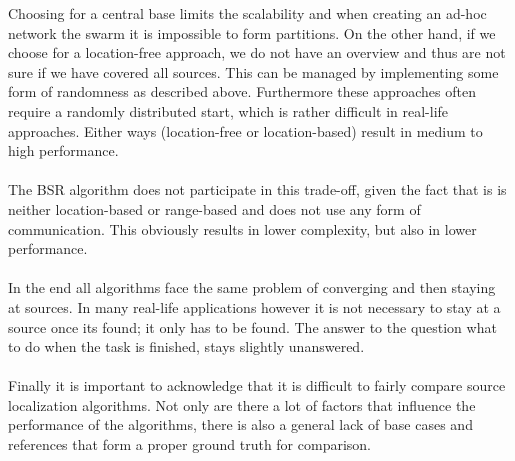 	Choosing for a central base limits the scalability and when creating an ad-hoc network the swarm it is impossible to form partitions. 
	On the other hand, if we choose for a location-free approach, we do not have an overview and thus are not sure if we have covered all sources. 
	This can be managed by implementing some form of randomness as described above. 
	Furthermore these approaches often require a randomly distributed start, which is rather difficult in real-life approaches. 
	Either ways (location-free or location-based) result in medium to high performance.\\
	\\
	The BSR algorithm does not participate in this trade-off, given the fact that is is neither location-based or range-based and does not use any form of communication. This obviously results in lower complexity, but also in lower performance. \\
	\\
	In the end all algorithms face the same problem of converging and then staying at sources. In many real-life applications however it is not necessary to stay at a source once its found; it only has to be found. The answer to the question what to do when the task is finished, stays slightly unanswered.\\
	\\
	Finally it is important to acknowledge that it is difficult to fairly compare source localization algorithms. Not only are there a lot of factors that influence the performance of the algorithms, there is also a general lack of base cases and references that form a proper ground truth for comparison.

